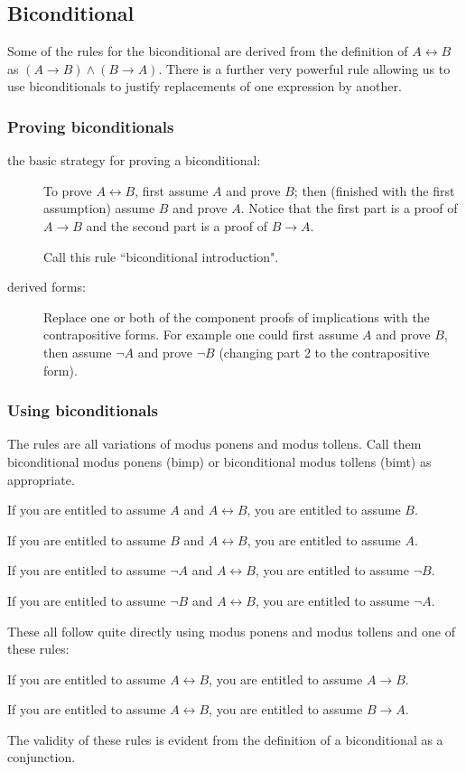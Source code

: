 \documentclass[12pt]{article}
\begin{document}
\subsection{Biconditional}

Some of the rules for the biconditional are derived from the definition of $A \leftrightarrow B$ as $(A \rightarrow B) \wedge (B \rightarrow A)$.  There is a further very powerful rule allowing us to use biconditionals to justify replacements of one expression by another.

\subsubsection{Proving biconditionals}

\begin{description}

\item[the basic strategy for proving a biconditional:]  To prove $A \leftrightarrow B$, first assume $A$ and prove $B$; then (finished with the first assumption) assume $B$ and prove $A$.  Notice that the first part is a proof of $A \rightarrow B$ and the second part is a proof of $B \rightarrow A$.

Call this rule ``biconditional introduction".

\item[derived forms:]  Replace one or both of the component proofs of implications with the contrapositive forms.  For example one could first
assume $A$ and prove $B$, then assume $\neg A$ and prove $\neg B$ (changing part 2 to the contrapositive form).

\end{description}

\subsubsection{Using biconditionals}  The rules are all variations of modus ponens and modus tollens.   Call them biconditional modus ponens (bimp)
or biconditional modus tollens (bimt) as appropriate.

If you are entitled to assume $A$ and $A \leftrightarrow B$, you are entitled to assume $B$.

If you are entitled to assume $B$ and $A \leftrightarrow B$, you are entitled to assume $A$.

If you are entitled to assume $\neg A$ and $A \leftrightarrow B$, you are entitled to assume $\neg B$.

If you are entitled to assume $\neg B$ and $A \leftrightarrow B$, you are entitled to assume $\neg A$.

These all follow quite directly using modus ponens and modus tollens and one of these rules:

If you are entitled to assume $A \leftrightarrow B$, you are entitled to assume $A \rightarrow B$.

If you are entitled to assume $A \leftrightarrow B$, you are entitled to assume $B \rightarrow A$.

The validity of these rules is evident from the definition of a biconditional as a conjunction.
\end{document}
